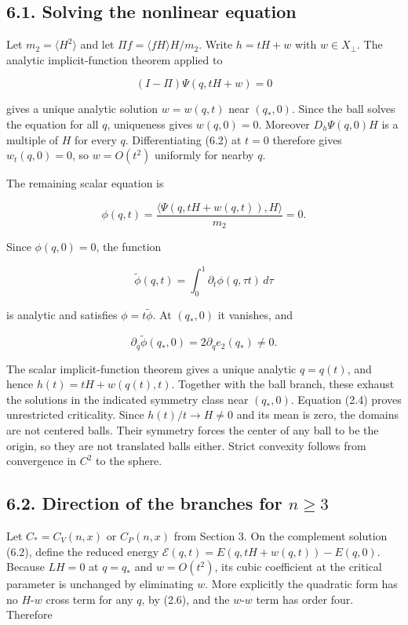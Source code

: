 \documentclass[11pt]{article}
\begin{document}
\subsection{6.1. Solving the nonlinear
equation}\label{solving-the-nonlinear-equation}

Let \(m_2=\langle H^2\rangle\) and let
\(\Pi f=\langle fH\rangle H/m_2\). Write \(h=tH+w\) with
\(w\in X_\perp\). The analytic implicit-function theorem applied to

\[
(I-\Pi)\Psi(q,tH+w)=0
\tag{6.2}
\]

gives a unique analytic solution \(w=w(q,t)\) near \((q_*,0)\). Since
the ball solves the equation for all \(q\), uniqueness gives
\(w(q,0)=0\). Moreover \(D_h\Psi(q,0)H\) is a multiple of \(H\) for
every \(q\). Differentiating (6.2) at \(t=0\) therefore gives
\(w_t(q,0)=0\), so \(w=O(t^2)\) uniformly for nearby \(q\).

The remaining scalar equation is

\[
\phi(q,t)=\frac{\langle\Psi(q,tH+w(q,t)),H\rangle}{m_2}=0.
\tag{6.3}
\]

Since \(\phi(q,0)=0\), the function

\[
\widetilde\phi(q,t)=\int_0^1\partial_t\phi(q,\tau t)\,d\tau
\tag{6.4}
\]

is analytic and satisfies \(\phi=t\widetilde\phi\). At \((q_*,0)\) it
vanishes, and

\[
\partial_q\widetilde\phi(q_*,0)=2\partial_q e_2(q_*)\ne0.
\tag{6.5}
\]

The scalar implicit-function theorem gives a unique analytic \(q=q(t)\),
and hence \(h(t)=tH+w(q(t),t)\). Together with the ball branch, these
exhaust the solutions in the indicated symmetry class near \((q_*,0)\).
Equation (2.4) proves unrestricted criticality. Since
\(h(t)/t\to H\ne0\) and its mean is zero, the domains are not centered
balls. Their symmetry forces the center of any ball to be the origin, so
they are not translated balls either. Strict convexity follows from
convergence in \(C^2\) to the sphere.

\subsection{\texorpdfstring{6.2. Direction of the branches for
\(n\ge3\)}{6.2. Direction of the branches for n\textbackslash ge3}}\label{direction-of-the-branches-for-nge3}

Let \(C_*=C_V(n,x)\) or \(C_P(n,x)\) from Section 3. On the complement
solution (6.2), define the reduced energy
\(\mathcal E(q,t)=E(q,tH+w(q,t))-E(q,0)\). Because \(L H=0\) at
\(q=q_*\) and \(w=O(t^2)\), its cubic coefficient at the critical
parameter is unchanged by eliminating \(w\). More explicitly the
quadratic form has no \(H\)-\(w\) cross term for any \(q\), by (2.6),
and the \(w\)-\(w\) term has order four. Therefore
\end{document}
